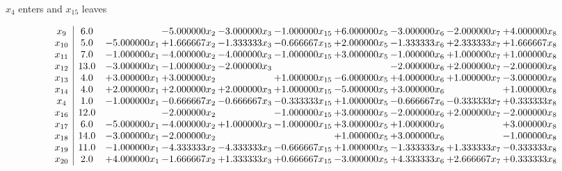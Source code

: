 \documentclass[10pt]{article}
\begin{document}
 $ x_{4} $ enters and $ x_{15} $ leaves 

 \[\begin{array}{c| c c@{\hskip 2pt} c@{\hskip 2pt} c@{\hskip 2pt} c@{\hskip 2pt} c@{\hskip 2pt} c@{\hskip 2pt} c@{\hskip 2pt} c@{\hskip 2pt} }
 x_{9}   &  6.0  &   & -5.000000 x_{2} & -3.000000 x_{3} & -1.000000 x_{15} & + 6.000000 x_{5} & -3.000000 x_{6} & -2.000000 x_{7} & + 4.000000 x_{8}\\
 x_{10}   &  5.0 & -5.000000 x_{1} & + 1.666667 x_{2} & -1.333333 x_{3} & -0.666667 x_{15} & + 2.000000 x_{5} & -1.333333 x_{6} & + 2.333333 x_{7} & + 1.666667 x_{8}\\
 x_{11}   &  7.0 & -1.000000 x_{1} & -4.000000 x_{2} & -4.000000 x_{3} & -1.000000 x_{15} & + 3.000000 x_{5} & -1.000000 x_{6} & + 1.000000 x_{7} & + 1.000000 x_{8}\\
 x_{12}   &  13.0 & -3.000000 x_{1} & -1.000000 x_{2} & -2.000000 x_{3} &    &   & -2.000000 x_{6} & + 2.000000 x_{7} & -2.000000 x_{8}\\
 x_{13}   &  4.0 & + 3.000000 x_{1} & + 3.000000 x_{2} &   & + 1.000000 x_{15} & -6.000000 x_{5} & + 4.000000 x_{6} & + 1.000000 x_{7} & -3.000000 x_{8}\\
 x_{14}   &  4.0 & + 2.000000 x_{1} & + 2.000000 x_{2} & + 2.000000 x_{3} & + 1.000000 x_{15} & -5.000000 x_{5} & + 3.000000 x_{6} &   & + 1.000000 x_{8}\\
 x_{4}   &  1.0 & -1.000000 x_{1} & -0.666667 x_{2} & -0.666667 x_{3} & -0.333333 x_{15} & + 1.000000 x_{5} & -0.666667 x_{6} & -0.333333 x_{7} & + 0.333333 x_{8}\\
 x_{16}   &  12.0  &   & -2.000000 x_{2} &   & -1.000000 x_{15} & + 3.000000 x_{5} & -2.000000 x_{6} & + 2.000000 x_{7} & -2.000000 x_{8}\\
 x_{17}   &  6.0 & -5.000000 x_{1} & -4.000000 x_{2} & + 1.000000 x_{3} & -1.000000 x_{15} & + 3.000000 x_{5} & + 1.000000 x_{6} &   & + 3.000000 x_{8}\\
 x_{18}   &  14.0 & -3.000000 x_{1} & -2.000000 x_{2} &    &   & + 1.000000 x_{5} & + 3.000000 x_{6} &   & -1.000000 x_{8}\\
 x_{19}   &  11.0 & -1.000000 x_{1} & -4.333333 x_{2} & -4.333333 x_{3} & -0.666667 x_{15} & + 1.000000 x_{5} & -1.333333 x_{6} & + 1.333333 x_{7} & -0.333333 x_{8}\\
 x_{20}   &  2.0 & + 4.000000 x_{1} & -1.666667 x_{2} & + 1.333333 x_{3} & + 0.666667 x_{15} & -3.000000 x_{5} & + 4.333333 x_{6} & + 2.666667 x_{7} & + 0.333333 x_{8}\\

\end{array}\]
\end{document}
